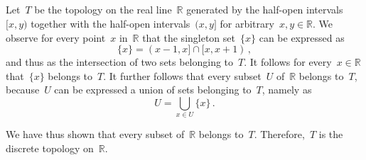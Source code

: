 \subsection{}

Let~$T$ be the topology on the real line~$ℝ$ generated by the half-open intervals~$[x, y)$ together with the half-open intervals~$(x, y]$ for arbitrary~$x, y ∈ ℝ$.
We observe for every point~$x$ in~$ℝ$ that the singleton set~$\{ x \}$ can be expressed as
\[
	\{ x \} = (x - 1, x] ∩ [x, x + 1) \,,
\]
and thus as the intersection of two sets belonging to~$T$.
It follows for every~$x ∈ ℝ$ that~$\{ x \}$ belongs to~$T$.
It further follows that every subset~$U$ of~$ℝ$ belongs to~$T$, because~$U$ can be expressed a union of sets belonging to~$T$, namely as
\[
	U = ⋃_{x ∈ U}{} \{ x \} \,.
\]

We have thus shown that every subset of~$ℝ$ belongs to~$T$.
Therefore,~$T$ is the discrete topology on~$ℝ$.
